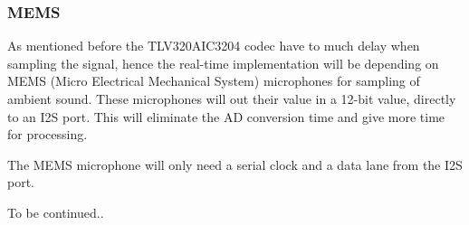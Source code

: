 \subsubsection*{MEMS}


As mentioned before the TLV320AIC3204 codec have to much delay when sampling the signal, hence the real-time implementation will be depending on MEMS (Micro Electrical Mechanical System) microphones for sampling of ambient sound. These microphones will out their value in a 12-bit value, directly to an I2S port. This will eliminate the AD conversion time and give more time for processing.

The MEMS microphone will only need a serial clock and a data lane from the I2S port.

To be continued..